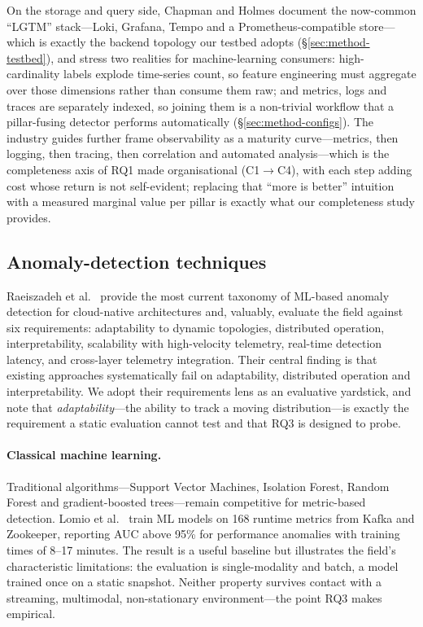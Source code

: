 \documentclass[pdflatex,sn-mathphys-num]{sn-jnl}%
\theoremstyle{thmstyleone}%
\theoremstyle{thmstyletwo}%
\theoremstyle{thmstylethree}%
\begin{document}
On the storage and query side, Chapman and Holmes \cite{chapman2023} document the now-common ``LGTM'' stack---Loki, Grafana, Tempo and a Prometheus-compatible store---which is exactly the backend topology our testbed adopts (\S\ref{sec:method-testbed}), and stress two realities for machine-learning consumers: high-cardinality labels explode time-series count, so feature engineering must aggregate over those dimensions rather than consume them raw; and metrics, logs and traces are separately indexed, so joining them is a non-trivial workflow that a pillar-fusing detector performs automatically (\S\ref{sec:method-configs}). The industry guides \cite{aws2022obs,beginnersobs,leadingobs} further frame observability as a maturity curve---metrics, then logging, then tracing, then correlation and automated analysis---which is the completeness axis of RQ1 made organisational (C1$\rightarrow$C4), with each step adding cost whose return is not self-evident; replacing that ``more is better'' intuition with a measured marginal value per pillar is exactly what our completeness study provides.

\subsection{Anomaly-detection techniques}\label{sec:bg-ad}

Raeiszadeh et al.\ \cite{raeiszadeh2026} provide the most current taxonomy of ML-based anomaly detection for cloud-native architectures and, valuably, evaluate the field against six requirements: adaptability to dynamic topologies, distributed operation, interpretability, scalability with high-velocity telemetry, real-time detection latency, and cross-layer telemetry integration. Their central finding is that existing approaches systematically fail on adaptability, distributed operation and interpretability. We adopt their requirements lens as an evaluative yardstick, and note that \emph{adaptability}---the ability to track a moving distribution---is exactly the requirement a static evaluation cannot test and that RQ3 is designed to probe.

\paragraph{Classical machine learning.} Traditional algorithms---Support Vector Machines, Isolation Forest, Random Forest and gradient-boosted trees---remain competitive for metric-based detection. Lomio et al.\ \cite{lomio2022} train ML models on 168 runtime metrics from Kafka and Zookeeper, reporting AUC above 95\% for performance anomalies with training times of 8--17 minutes. The result is a useful baseline but illustrates the field's characteristic limitations: the evaluation is single-modality and batch, a model trained once on a static snapshot. Neither property survives contact with a streaming, multimodal, non-stationary environment---the point RQ3 makes empirical.
\end{document}
